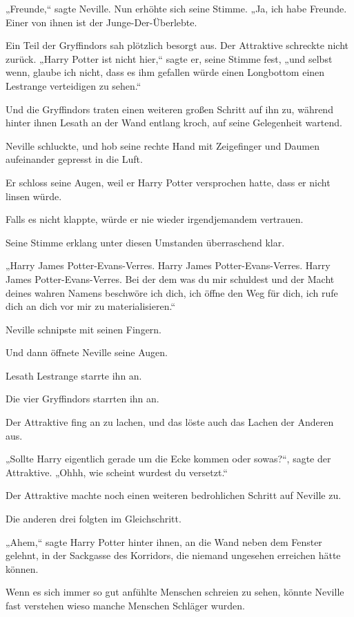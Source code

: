 {„Freunde,“ sagte Neville. Nun erhöhte sich seine Stimme. „Ja, ich habe Freunde. Einer von ihnen ist der Junge-Der-Überlebte.

Ein Teil der Gryffindors sah plötzlich besorgt aus. Der Attraktive schreckte nicht zurück. „Harry Potter ist nicht hier,“ sagte er, seine Stimme fest, „und selbst wenn, glaube ich nicht, dass es ihm gefallen würde einen Longbottom einen Lestrange verteidigen zu sehen.“

Und die Gryffindors traten einen weiteren großen Schritt auf ihn zu, während hinter ihnen Lesath an der Wand entlang kroch, auf seine Gelegenheit wartend.

Neville schluckte, und hob seine rechte Hand mit Zeigefinger und Daumen aufeinander gepresst in die Luft.

Er schloss seine Augen, weil er Harry Potter versprochen hatte, dass er nicht linsen würde.

Falls es nicht klappte, würde er nie wieder irgendjemandem vertrauen.

Seine Stimme erklang unter diesen Umstanden überraschend klar.

„Harry James Potter-Evans-Verres. Harry James Potter-Evans-Verres. Harry James Potter-Evans-Verres. Bei der dem was du mir schuldest und der Macht deines wahren Namens beschwöre ich dich, ich öffne den Weg für dich, ich rufe dich an dich vor mir zu materialisieren.“

Neville schnipste mit seinen Fingern.

Und dann öffnete Neville seine Augen.

Lesath Lestrange starrte ihn an.

Die vier Gryffindors starrten ihn an.

Der Attraktive fing an zu lachen, und das löste auch das Lachen der Anderen aus.

„Sollte Harry eigentlich gerade um die Ecke kommen oder sowas?“, sagte der Attraktive. „Ohhh, wie scheint wurdest du versetzt.“

Der Attraktive machte noch einen weiteren bedrohlichen Schritt auf Neville zu.

Die anderen drei folgten im Gleichschritt.

„Ahem,“ sagte Harry Potter hinter ihnen, an die Wand neben dem Fenster gelehnt, in der Sackgasse des Korridors, die niemand ungesehen erreichen hätte können.

Wenn es sich immer so gut anfühlte Menschen schreien zu sehen, könnte Neville fast verstehen wieso manche Menschen Schläger wurden.

}
